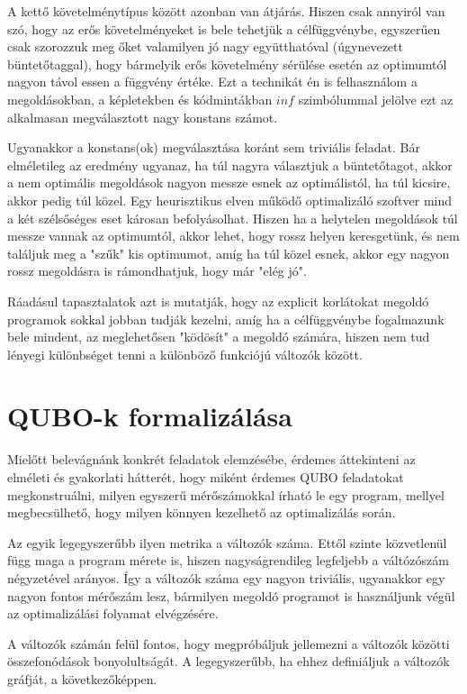 A kettő követelménytípus között azonban van átjárás. Hiszen csak annyiról van szó, hogy az erős követelményeket is bele tehetjük a célfüggvénybe, egyszerűen csak szorozzuk meg őket valamilyen jó nagy együtthatóval (úgynevezett büntetőtaggal), hogy bármelyik erős követelmény sérülése esetén az optimumtól nagyon távol essen a függvény értéke.
Ezt a technikát én is felhasználom a megoldásokban, a képletekben és kódmintákban $inf$ szimbólummal jelölve ezt az alkalmasan megválasztott nagy konstans számot.

Ugyanakkor a konstans(ok) megválasztása koránt sem triviális feladat. Bár elméletileg az eredmény ugyanaz, ha túl nagyra választjuk a büntetőtagot, akkor a nem optimális megoldások nagyon messze esnek az optimálistól, ha túl kicsire, akkor pedig túl közel. Egy heurisztikus elven működő optimalizáló szoftver mind a két szélsőséges eset károsan befolyásolhat. Hiszen ha a helytelen megoldások túl messze vannak az optimumtól, akkor lehet, hogy rossz helyen keresgetünk, és nem találjuk meg a "szűk" kis optimumot, amíg ha túl közel esnek, akkor egy nagyon rossz megoldásra is rámondhatjuk, hogy már "elég jó".

Ráadásul tapasztalatok azt is mutatják, hogy az explicit korlátokat megoldó programok sokkal jobban tudják kezelni, amíg ha a célfüggvénybe fogalmazunk bele mindent, az meglehetősen "ködösít" a megoldó számára, hiszen nem tud lényegi különbséget tenni a különböző funkciójú változók között.

\section{QUBO-k formalizálása}

Mielőtt belevágnánk konkrét feladatok elemzésébe, érdemes áttekinteni az elméleti és gyakorlati hátterét, hogy miként érdemes QUBO feladatokat megkonstruálni, milyen egyszerű mérőszámokkal írható le egy program, mellyel megbecsülhető, hogy milyen könnyen kezelhető az optimalizálás során.

Az egyik legegyszerűbb ilyen metrika a változók száma. Ettől szinte közvetlenül függ maga a program mérete is, hiszen nagyságrendileg legfeljebb a váltózószám négyzetével arányos. Így a változók száma egy nagyon triviális, ugyanakkor egy nagyon fontos mérőszám lesz, bármilyen megoldó programot is használjunk végül az optimalizálási folyamat elvégzésére.

A változók számán felül fontos, hogy megpróbáljuk jellemezni a változók közötti összefonódások bonyolultságát. A legegyszerűbb, ha ehhez definiáljuk a változók gráfját, a következőképpen.

